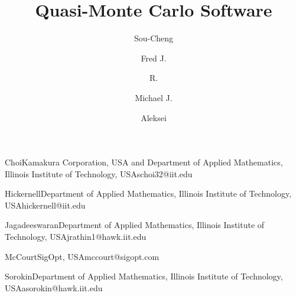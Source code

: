 % 
%


%
\title{Quasi-Monte Carlo Software}

\author{Sou-Cheng}{Choi}{Kamakura Corporation, USA and Department of Applied Mathematics, Illinois Institute of Technology, USA}{schoi32@iit.edu}
\author{Fred J.}{Hickernell}{Department of Applied Mathematics, Illinois Institute of Technology, USA}{hickernell@iit.edu}
\author{R.}{Jagadeeswaran}{Department of Applied Mathematics, Illinois Institute of Technology, USA}{jrathin1@hawk.iit.edu}
\author{Michael J.}{McCourt}{SigOpt, USA}{mccourt@sigopt.com}
\author{Aleksei}{Sorokin}{Department of Applied Mathematics, Illinois Institute of Technology, USA}{asorokin@hawk.iit.edu}


